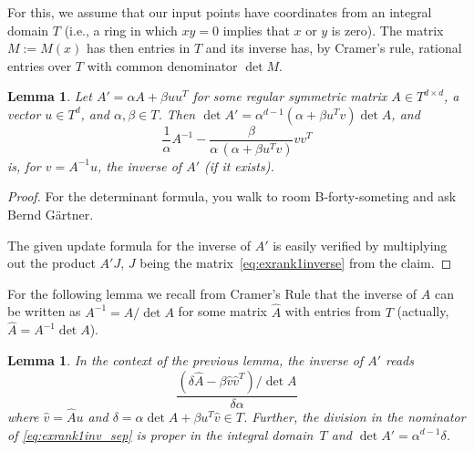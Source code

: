 \documentclass[a4paper,twocolumn]{article}
\newtheorem{lemma}[theorem]{Lemma}
\begin{document}
For this, we assume that our input points have coordinates from an
integral domain $T$ (i.e., a ring in which $xy=0$ implies that $x$ or
$y$ is zero).  The matrix $M:= M(x)$ has then entries in $T$ and its
inverse has, by Cramer's rule, rational entries over $T$ with common
denominator $\det M$.
%
\begin{lemma}
  Let $A'=\alpha A + \beta uu^T$ for some regular symmetric matrix
  $A\in T^{d\times d}$, a vector $u\in T^d$, and $\alpha,\beta\in
  T$.  Then $\det A' = \alpha^{d-1}(\alpha+\beta u^Tv) \det A$, and
  \begin{equation}
    \label{eq:exrank1inverse}
    \frac{1}{\alpha} A^{-1} -
    \frac{\beta}{\alpha\,(\alpha+\beta u^T v)}vv^T
  \end{equation}
  is, for $v = A^{-1} u$, the inverse of $A'$ (if it exists).
\end{lemma}
%
\begin{proof}
  For the determinant formula, you walk to room B-forty-someting and
  ask Bernd G\"artner.

  The given update formula for the inverse of $A'$ is easily verified
  by multiplying out the product $A' J$, $J$ being the
  matrix~\eqref{eq:exrank1inverse} from the claim.
\end{proof}
%
For the following lemma we recall from Cramer's Rule that the inverse
of $A$ can be written as $A^{-1} = \hat{A} / \det{A}$ for some matrix
$\hat{A}$ with entries from $T$ (actually, $\hat{A} = A^{-1}
\det{A}$).
%
\begin{lemma}
  \label{lemma:rank1update}
  In the context of the previous lemma, the inverse of $A'$ reads
  \begin{equation}
    \label{eq:exrank1inv_sep}
    \frac{(\delta \hat{A} - \beta\hat{v}\hat{v}^T)/\det{A}}%
	 {\delta\alpha}
  \end{equation}
  where $\hat{v} = \hat{A} u$ and $\delta = \alpha \det{A} + \beta
  u^T\hat{v}\in T$.  Further, the division in the nominator of
  \eqref{eq:exrank1inv_sep} is proper in the integral domain~$T$ and
  $\det{A'} = \alpha^{d-1} \delta$.
\end{lemma}
%
\end{document}
